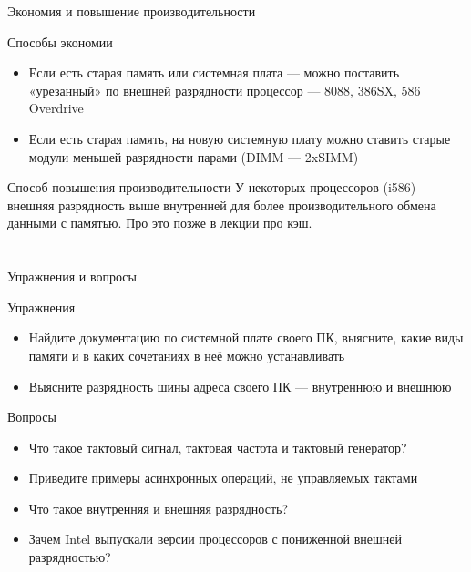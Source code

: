 \documentclass[xetex,aspectratio=43]{beamer}
\begin{document}
\begin{frame}{Экономия и повышение производительности}

    \begin{block}{Способы экономии}
    \begin{itemize}
        \tightlist
        \item
        Если есть старая память или системная плата --- можно поставить
        «урезанный» по внешней разрядности процессор --- 8088, 386SX, 586
        Overdrive
        \item
        Если есть старая память, на новую системную плату можно ставить старые
        модули меньшей разрядности парами (DIMM --- 2xSIMM)
    \end{itemize}
    \end{block}

    \pause

    \begin{block}{Способ повышения производительности}
    У некоторых процессоров (i586) внешняя разрядность выше внутренней
    для более производительного обмена данными с памятью. Про это позже в
    лекции про кэш.
    \end{block}
\end{frame}

\section*{}

\begin{frame}{Упражнения и вопросы}
        \begin{block}{Упражнения}
    \begin{itemize}
        \tightlist
        \item
        Найдите документацию по системной плате своего ПК, выясните, какие
        виды памяти и в каких сочетаниях в неё можно устанавливать
        \item
        Выясните разрядность шины адреса своего ПК --- внутреннюю и внешнюю
    \end{itemize}
\end{block}

\begin{block}{Вопросы}
    \begin{itemize}
        \tightlist
        \item
        Что такое тактовый сигнал, тактовая частота и тактовый генератор?
        \item
        Приведите примеры асинхронных операций, не управляемых тактами
        \item
        Что такое внутренняя и внешняя разрядность?
        \item
        Зачем Intel выпускали версии процессоров с пониженной внешней разрядностью?
    \end{itemize}
\end{block}
\end{frame}

\postamble
\end{document}
